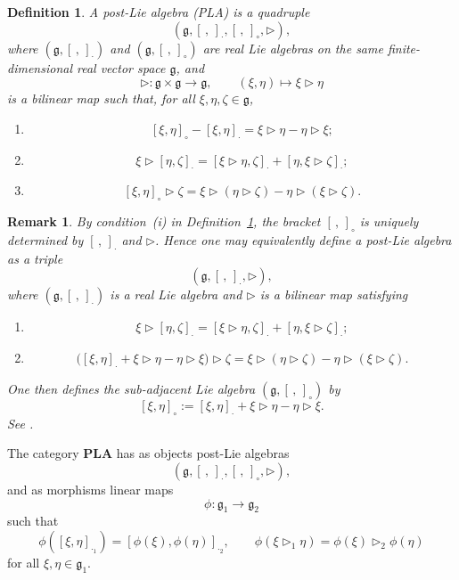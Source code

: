 \documentclass[reqno]{amsart}
\newtheorem{definition}[theorem]{Definition}
\newtheorem{remark}[theorem]{Remark}
\newcommand{\g}{\mathfrak{g}}
\begin{document}
\begin{definition}\label{postLieAlgebras}
A \emph{post-Lie algebra} (PLA) is a quadruple
\[
(\g,[\, ,\,]_{\cdot},[\, ,\,]_{\circ},\triangleright),
\]
where $(\g,[\, ,\,]_{\cdot})$ and $(\g,[\, ,\,]_{\circ})$ are real Lie algebras
on the same finite-dimensional real vector space $\g$, and
\[
\triangleright:\g\times \g\to \g,
\qquad
(\xi,\eta)\mapsto \xi\triangleright \eta
\]
is a bilinear map such that, for all $\xi,\eta,\zeta\in\g$,
\begin{enumerate}[label=\textup{(\roman*)}]
\item
\[
[\xi,\eta]_{\circ}-[\xi,\eta]_{\cdot}
=
\xi\triangleright \eta-\eta\triangleright \xi;
\]
\item
\[
\xi\triangleright [\eta,\zeta]_{\cdot}
=
[\xi\triangleright \eta,\zeta]_{\cdot}
+
[\eta,\xi\triangleright \zeta]_{\cdot};
\]
\item
\[
[\xi,\eta]_{\circ}\triangleright \zeta
=
\xi\triangleright (\eta\triangleright \zeta)
-
\eta\triangleright (\xi\triangleright \zeta).
\]
\end{enumerate}
\end{definition}

\begin{remark}\rm
By condition~\textup{(i)} in Definition~\ref{postLieAlgebras}, the bracket
$[\, ,\,]_{\circ}$ is uniquely determined by $[\, ,\,]_{\cdot}$ and
$\triangleright$. Hence one may equivalently define a post-Lie algebra as a
triple
\[
(\g,[\, ,\,]_{\cdot},\triangleright),
\]
where $(\g,[\, ,\,]_{\cdot})$ is a real Lie algebra and $\triangleright$ is a
bilinear map satisfying
\begin{enumerate}[label=\textup{(\roman*)}]
\item
\[
\xi\triangleright [\eta,\zeta]_{\cdot}
=
[\xi\triangleright \eta,\zeta]_{\cdot}
+
[\eta,\xi\triangleright \zeta]_{\cdot};
\]
\item
\[
\bigl([\xi,\eta]_{\cdot}
+\xi\triangleright \eta
-\eta\triangleright \xi\bigr)\triangleright \zeta
=
\xi\triangleright (\eta\triangleright \zeta)
-
\eta\triangleright (\xi\triangleright \zeta).
\]
\end{enumerate}
One then defines the \emph{sub-adjacent Lie algebra}
$(\g,[\, ,\,]_{\circ})$ by
\[
[\xi,\eta]_{\circ}
:=
[\xi,\eta]_{\cdot}
+\xi\triangleright \eta
-\eta\triangleright \xi.
\]
See \cite{BaiGuoShengTang2023,Burde2012affineaction}.
\end{remark}

The category $\mathbf{PLA}$ has as objects post-Lie algebras
\[
(\g,[\, ,\,]_{\cdot},[\, ,\,]_{\circ},\triangleright),
\]
and as morphisms linear maps
\[
\phi:\g_1\to \g_2
\]
such that
\[
\phi([\xi,\eta]_{\cdot_1})
=
[\phi(\xi),\phi(\eta)]_{\cdot_2},
\qquad
\phi(\xi\triangleright_1 \eta)
=
\phi(\xi)\triangleright_2 \phi(\eta)
\]
for all $\xi,\eta\in\g_1$.
\end{document}
